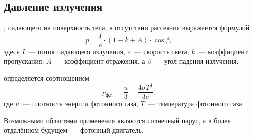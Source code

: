 \subsection{Давление излучения}
, падающего на поверхность тела, в отсутствии рассеяния выражается формулой
\begin{equation}
p = \frac{I}{c} \cdot (1 - k + A) \cdot \cos \beta,
\end{equation}
здесь $I$~--- поток падающего излучения, $c$~--- скорость света, $k$~--- коэффициент пропускания, $A$~--- коэффициент отражения, а $\beta$~--- угол падения излучения.

 определяется соотношением
\begin{equation}
p_\text{ф.г.} = \frac{u}{3} = \frac{4 \sigma T^4}{3c},
\end{equation}
где $u$~--- плотность энергии фотонного газа, $T$~--- температура фотонного газа.

Возможными областями применения являются солнечный парус, а в более отдалённом будущем~--- фотонный двигатель.